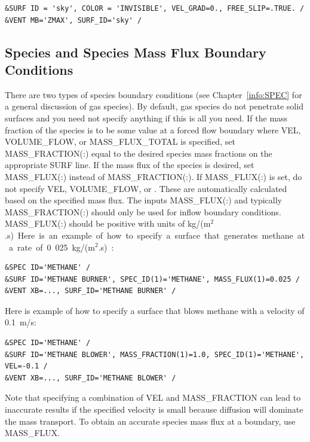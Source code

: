 \documentclass[11pt]{book}
\begin{document}
\begin{lstlisting}
&SURF ID = 'sky', COLOR = 'INVISIBLE', VEL_GRAD=0., FREE_SLIP=.TRUE. /
&VENT MB='ZMAX', SURF_ID='sky' /
\end{lstlisting}


\subsection{Species and Species Mass Flux Boundary Conditions}
\label{info:MASS_FLUX}

There are two types of species boundary conditions (see Chapter~\ref{info:SPEC} for a general discussion of gas species). By default, gas species do not penetrate solid surfaces and you need not specify anything if this is all you need. If the mass fraction of the species is to be some value at a forced flow boundary where {\ct VEL}, {\ct VOLUME\_FLOW}, or {\ct MASS\_FLUX\_TOTAL} is specified, set {\ct MASS\_FRACTION(:)} equal to the desired species mass fractions on the appropriate {\ct SURF} line. If the mass flux of the species is desired, set {\ct MASS\_FLUX(:)} instead of {\ct MASS\_FRACTION(:)}. If {\ct MASS\_FLUX(:)} is set, do not specify {\ct VEL}, {\ct VOLUME\_FLOW}, or . These are automatically calculated based on the specified mass flux. The inputs {\ct MASS\_FLUX(:)} and typically {\ct MASS\_FRACTION(:)} should only be used for inflow boundary conditions.  {\ct MASS\_FLUX(:)} should be positive with units of \si{kg/(m$^2$.s)}.

Here is an example of how to specify a surface that generates methane at a rate of 0.025~\si{kg/(m$^2$.s)}:
\begin{lstlisting}
&SPEC ID='METHANE' /
&SURF ID='METHANE BURNER', SPEC_ID(1)='METHANE', MASS_FLUX(1)=0.025 /
&VENT XB=..., SURF_ID='METHANE BURNER' /
\end{lstlisting}
Here is example of how to specify a surface that blows methane with a velocity of 0.1~m/s:
\begin{lstlisting}
&SPEC ID='METHANE' /
&SURF ID='METHANE BLOWER', MASS_FRACTION(1)=1.0, SPEC_ID(1)='METHANE', VEL=-0.1 /
&VENT XB=..., SURF_ID='METHANE BLOWER' /
\end{lstlisting}
Note that specifying a combination of {\ct VEL} and {\ct MASS\_FRACTION} can lead to inaccurate results if the specified velocity is small because diffusion will dominate the mass transport.  To obtain an accurate species mass flux at a boundary, use {\ct MASS\_FLUX}.
\end{document}
